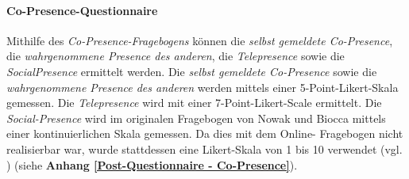 \documentclass[a4paper,11pt]{article}%
\renewcommand{\\}{\vspace*{0.5\baselineskip} \newline}
\begin{document}
		\paragraph{Co-Presence-Questionnaire}
Mithilfe des \textit{Co-Presence-Fragebogens} können die \textit{selbst gemeldete Co-Presence}, die \textit{wahrgenommene Presence des \dq{}anderen\dq{}}, die \textit{Telepresence} sowie die \textit{SocialPresence} ermittelt werden. Die \textit{selbst gemeldete Co-Presence} sowie die \textit{wahrgenommene Presence des \dq{}anderen\dq{}} werden mittels einer 5-Point-Likert-Skala gemessen. Die \textit{Telepresence} wird mit einer 7-Point-Likert-Scale ermittelt. Die \textit{Social-Presence} wird im originalen Fragebogen von Nowak und Biocca mittels einer kontinuierlichen Skala gemessen. Da dies mit dem Online-
Fragebogen nicht realisierbar war, wurde stattdessen eine Likert-Skala von 1 bis 10 verwendet (vgl. \citep[p.487]{nowak2003effect}) (siehe \textbf{Anhang \ref{Post-Questionnaire - Co-Presence}}).
%
%
%
%
%
%
\end{document}
